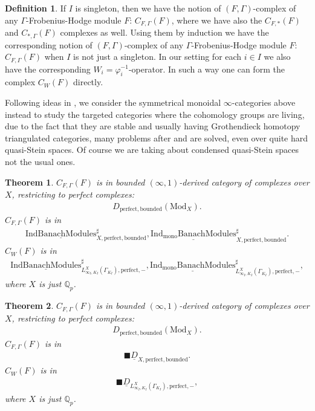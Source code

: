\documentclass[12pt]{article}
\newtheorem{theorem}{Theorem}
\theoremstyle{definition}
\newtheorem{definition}{Definition}
\begin{document}
\begin{definition}
If $I$ is singleton, then we have the notion of $(F,\Gamma)$-complex of any $\Gamma$-Frobenius-Hodge module $F$: $C_{F,\Gamma}(F)$, where we have also the $C_{F,*}(F)$ and $C_{*,\Gamma}(F)$ complexes as well. Using them by induction we have the corresponding notion of $(F,\Gamma)$-complex of any $\Gamma$-Frobenius-Hodge module $F$: $C_{F,\Gamma}(F)$ when $I$ is not just a singleton. In our setting for each $i\in I$ we also have the corresponding $W_i=\varphi_i^{-1}$-operator. In such a way one can form the complex $C_{W}(F)$ directly.
\end{definition}

Following ideas in \cite{T}, \cite{KPX} we consider the symmetrical monoidal $\infty$-categories above instead to study the targeted categories where the cohomology groups are living, due to the fact that they are stable and usually having Grothendieck homotopy triangulated categories, many problems after \cite{T} and \cite{KPX} are solved, even over quite hard quasi-Stein spaces. Of course we are taking about condensed quasi-Stein spaces not the usual ones.

\begin{theorem}
$C_{F,\Gamma}(F)$ is in bounded $(\infty,1)$-derived category of complexes over $X$, restricting to perfect complexes:
\begin{align}
D_{\mathrm{perfect},\mathrm{bounded}}(\mathrm{Mod}_X).
\end{align}
$C_{F,\Gamma}(F)$ is in 
\begin{align}
\underline{\mathrm{IndBanachModules}}^\sharp_{X,\mathrm{perfect},\mathrm{bounded}}, \underline{\mathrm{Ind_{\mathrm{mono}}BanachModules}}^\sharp_{X, \mathrm{perfect},\mathrm{bounded}}.
\end{align} 
$C_{W}(F)$ is in 
\begin{align}
\underline{\mathrm{IndBanachModules}}^\sharp_{L^X_{\infty_I,K_I}(\Gamma_{K_I}),\mathrm{perfect},\mathrm{-}}, \underline{\mathrm{Ind_{\mathrm{mono}}BanachModules}}^\sharp_{L^X_{\infty_I,K_I}(\Gamma_{K_I}), \mathrm{perfect},\mathrm{-}},
\end{align}
where $X$ is just $\mathbb{Q}_p$.
\end{theorem}

\begin{theorem}
$C_{F,\Gamma}(F)$ is in bounded $(\infty,1)$-derived category of complexes over $X$, restricting to perfect complexes:
\begin{align}
D_{\mathrm{perfect},\mathrm{bounded}}(\mathrm{Mod}_X).
\end{align}
$C_{F,\Gamma}(F)$ is in 
\begin{align}
\blacksquare\underline{D}_{X,\mathrm{perfect},\mathrm{bounded}}.
\end{align} 
$C_{W}(F)$ is in 
\begin{align}
\blacksquare\underline{D}_{L^X_{\infty_I,K_I}(\Gamma_{K_I}),\mathrm{perfect},-},
\end{align}
where $X$ is just $\mathbb{Q}_p$.
\end{theorem}
\end{document}
